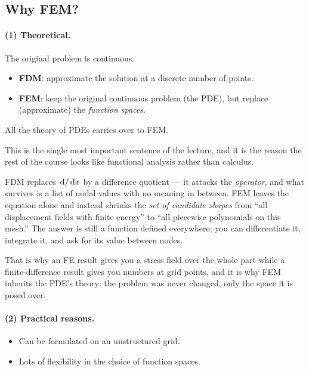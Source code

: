 \subsection*{Why FEM?}

\paragraph{(1) Theoretical.}
The original problem is continuous.
\begin{itemize}[leftmargin=1.6em,itemsep=1pt]
  \item \textbf{FDM}: approximate the solution at a discrete number of points.
  \item \textbf{FEM}: keep the original continuous problem (the PDE), but
        replace (approximate) the \emph{function spaces}.
\end{itemize}
All the theory of PDEs carries over to FEM.

\begin{intuition}
This is the single most important sentence of the lecture, and it is the
reason the rest of the course looks like functional analysis rather than
calculus.

FDM replaces $\,\mathrm{d}/\,\mathrm{d} x$ by a difference quotient --- it attacks the
\emph{operator}, and what survives is a list of nodal values with no meaning in
between. FEM leaves the equation alone and instead shrinks the \emph{set of
candidate shapes} from ``all displacement fields with finite energy'' to ``all
piecewise polynomials on this mesh.'' The answer is still a function defined
everywhere; you can differentiate it, integrate it, and ask for its value
between nodes.

That is why an FE result gives you a stress field over the whole part while a
finite-difference result gives you numbers at grid points, and it is why FEM
inherits the PDE's theory: the problem was never changed, only the space it is
posed over.
\end{intuition}

\paragraph{(2) Practical reasons.}
\begin{itemize}[leftmargin=1.6em,itemsep=1pt]
  \item Can be formulated on an unstructured grid.
  \item Lots of flexibility in the choice of function spaces.
\end{itemize}

